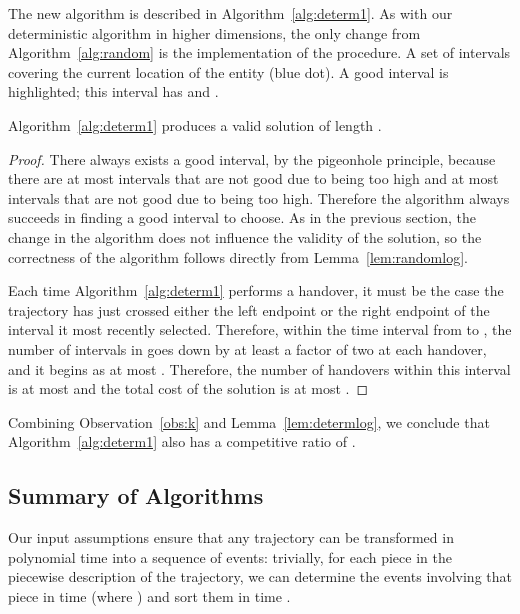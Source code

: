 \documentclass[runningheads]{llncs}
\begin{document}
      The new algorithm is described in Algorithm~\ref {alg:determ1}.
As with our deterministic algorithm in higher dimensions, the only change from  Algorithm~\ref {alg:random} is the implementation of the  procedure.
       {A set of  intervals covering the current location of the entity (blue dot). A good interval is highlighted; this interval has  and .}

      \begin {lemma} \label {lem:determlog}
        Algorithm~\ref {alg:determ1} produces a valid solution of length .
      \end {lemma}
      
      \begin {proof}
       There always exists a good interval, by the pigeonhole principle, because there are at most  intervals that are not good due to  being too high and at most  intervals that are not good due to  being too high. Therefore the algorithm always succeeds in finding a good interval to choose.
        As in the previous section, the change in the algorithm does not influence the validity of the solution, so the correctness of the algorithm follows directly from Lemma~\ref {lem:randomlog}.

        Each time Algorithm~\ref{alg:determ1} performs a handover, it must be the case the trajectory has just crossed either the left endpoint or the right endpoint of the interval it most recently selected. Therefore, within the time interval from  to , the number of intervals in  goes down by at least a factor of two at each handover, and it begins as at most . Therefore, the number of handovers within this interval is at most  and the total cost of the solution is at most .
      \end {proof}            
      
      Combining Observation~\ref {obs:k} and Lemma~\ref {lem:determlog}, we conclude that Algorithm~\ref {alg:determ1} also has a competitive ratio of .

    \subsection {Summary of Algorithms} \label {sec:runtime}
Our input assumptions ensure that any trajectory can be transformed in polynomial time into a sequence of events: trivially, for each piece in the piecewise description of the trajectory, we can determine the events involving that piece in time  (where ) and sort them in time .
\end{document}
